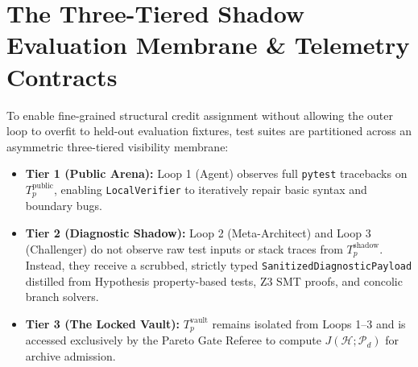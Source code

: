 \documentclass[10pt,twocolumn,letterpaper]{article}
\begin{document}
\section{The Three-Tiered Shadow Evaluation Membrane \& Telemetry Contracts}
To enable fine-grained structural credit assignment without allowing the outer loop to overfit to held-out evaluation fixtures, test suites are partitioned across an asymmetric three-tiered visibility membrane:
\begin{itemize}
    \item \textbf{Tier 1 (Public Arena):} Loop 1 (Agent) observes full \texttt{pytest} tracebacks on $T_{p}^{\text{public}}$, enabling \texttt{LocalVerifier} to iteratively repair basic syntax and boundary bugs.
    \item \textbf{Tier 2 (Diagnostic Shadow):} Loop 2 (Meta-Architect) and Loop 3 (Challenger) do not observe raw test inputs or stack traces from $T_{p}^{\text{shadow}}$. Instead, they receive a scrubbed, strictly typed \texttt{Sanitized\allowbreak Diagnostic\allowbreak Payload} distilled from Hypothesis property-based tests, Z3 SMT proofs, and concolic branch solvers.
    \item \textbf{Tier 3 (The Locked Vault):} $T_{p}^{\text{vault}}$ remains isolated from Loops 1--3 and is accessed exclusively by the Pareto Gate Referee to compute $J(\mathcal{H};\mathcal{P}_{d})$ for archive admission.
\end{itemize}
\end{document}
